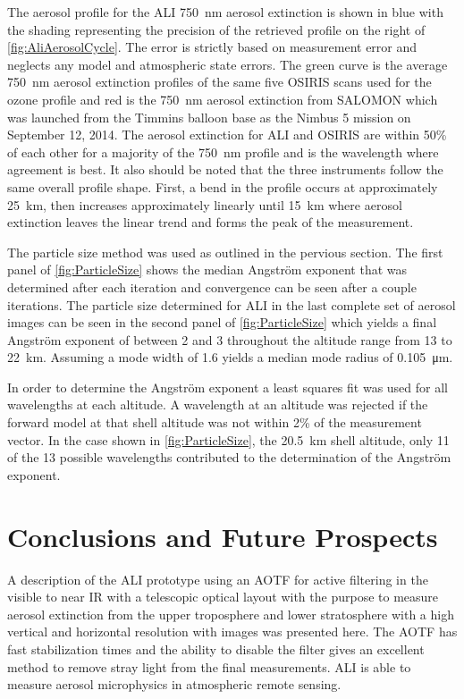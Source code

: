 \documentclass[12pt]{article}
\begin{document}
The aerosol profile for the ALI 750~nm aerosol extinction is shown in blue with the shading representing the precision of the retrieved profile on the right of \autoref{fig:AliAerosolCycle}. The error is strictly based on measurement error and neglects any model and atmospheric state errors. The green curve is the average 750~nm aerosol extinction profiles of the same five OSIRIS scans used for the ozone profile and red is the 750~nm aerosol extinction from SALOMON \citep{Berthet2002} which was launched from the Timmins balloon base as the Nimbus 5 mission on September 12, 2014. The aerosol extinction for ALI and OSIRIS are within 50\% of each other for a majority of the 750~nm profile and is the wavelength where agreement is best. It also should be noted that the three instruments follow the same overall profile shape.  First, a bend in the profile occurs at approximately 25~km, then increases approximately linearly until 15~km where aerosol extinction leaves the linear trend and forms the peak of the measurement. %

The particle size method was used as outlined in the pervious section. The first panel of \autoref{fig:ParticleSize} shows the median Angstr\"{o}m exponent that was determined after each iteration and convergence can be seen after a couple iterations. The particle size determined for ALI in the last complete set of aerosol images can be seen in the second panel of \autoref{fig:ParticleSize} which yields a final Angstr\"{o}m exponent of between 2 and 3 throughout the altitude range from 13 to 22~km. Assuming a mode width of 1.6 yields a median mode radius of 0.105~\si{\micro\metre}.

In order to determine the Angstr\"{o}m exponent a least squares fit was used for all wavelengths at each altitude. A wavelength at an altitude was rejected if the forward model at that shell altitude was not within 2\% of the measurement vector. In the case shown in \autoref{fig:ParticleSize}, the 20.5~km shell altitude, only 11 of the 13 possible wavelengths contributed to the determination of the Angstr\"{o}m exponent.

\section{Conclusions and Future Prospects}

A description of the ALI prototype using an AOTF for active filtering in the visible to near IR with a telescopic optical layout with the purpose to measure aerosol extinction from the upper troposphere and lower stratosphere with a high vertical and horizontal resolution with images was presented here. The AOTF has fast stabilization times and the ability to disable the filter gives an excellent method to remove stray light from the final measurements. ALI is able to measure aerosol microphysics in atmospheric remote sensing.
\end{document}
